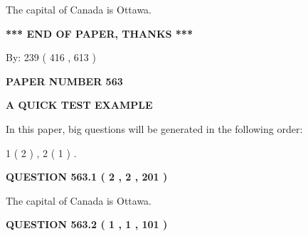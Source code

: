 \documentclass[12pt]{article}
\begin{document}
 
The capital of Canada is Ottawa.
 
 
 
 
   
   
 \vspace{0.2in}
 
   
   
   
   
\vspace{1.0in} 
{\textbf{\large{ *** END OF PAPER, THANKS *** }}} 
   
   
\hspace{1.0in} By: 
 239 ( 416 ,  613 )
   
   
   
   
\newpage 
\setcounter{page}{ 
   563001 } 
   
   
   
   
 {\textbf{ \Large{ PAPER NUMBER  563  }}}
   
   
\vspace{0.2in}
   
   
   
   
   
   
 \vspace{0.2in}
{\LARGE {\textbf{ A QUICK TEST EXAMPLE}}}
   
   
   
\vspace{0.2in}
   
In this paper, big questions will be generated in the following order: 
   
   
   1 ( 2 )
 ,
   2 ( 1 )
 .
  
\vspace{0.2in}
  
{\textbf{\Large{QUESTION
563.1 
 ( 2 , 2 , 201 )
}}}
  
  
 
 
\noindent{}
 
 
The capital of Canada is Ottawa.
 
 
 
 
  
\vspace{0.2in}
  
{\textbf{\Large{QUESTION
563.2 
 ( 1 , 1 , 101 )
}}}
  
  
 
\end{document}
